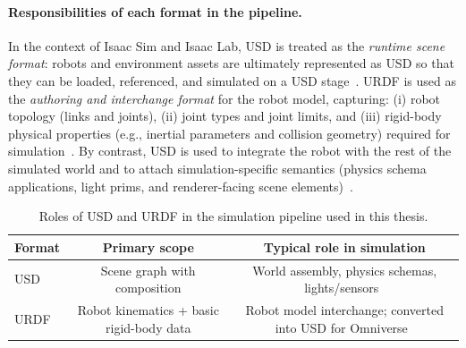 \paragraph{Responsibilities of each format in the pipeline.}
In the context of Isaac Sim and Isaac Lab, \ac{USD} is treated as the \emph{runtime scene format}: robots and environment assets are ultimately represented as \ac{USD} so that they can be loaded, referenced, and simulated on a \ac{USD} stage~\cite{isaaclab_import_new_asset}. \ac{URDF} is used as the \emph{authoring and interchange format} for the robot model, capturing:
(i) robot topology (links and joints),
(ii) joint types and joint limits, and
(iii) rigid-body physical properties (e.g., inertial parameters and collision geometry) required for simulation~\cite{ros2_urdf_physical_properties}.
By contrast, \ac{USD} is used to integrate the robot with the rest of the simulated world and to attach simulation-specific semantics (physics schema applications, light prims, and renderer-facing scene elements)~\cite{openusd_usd_faq,openusd_usdphysics_schema,openusd_usdlux_schema}.

\begin{table}[htb]
    \centering
    \caption{Roles of \ac{USD} and \ac{URDF} in the simulation pipeline used in this thesis.}\label{tab:usd_urdf_roles}
    \begin{tabular}{l c c}
    \hline
    \textbf{Format} & \textbf{Primary scope} & \textbf{Typical role in simulation} \\
    \hline
    \ac{USD} & Scene graph with composition & World assembly, physics schemas, lights/sensors~\cite{openusd_usd_faq,openusd_usdphysics_schema,openusd_usdlux_schema} \\
    \ac{URDF} & Robot kinematics + basic rigid-body data & Robot model interchange; converted into \ac{USD} for Omniverse~\cite{ros2_urdf_main,isaacsim_import_urdf_510} \\
    \hline
    \end{tabular}
\end{table}

